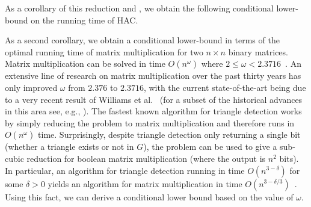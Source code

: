 As a corollary of this reduction and , we obtain the following conditional lower-bound on the running time of HAC.

\mainLowerSeq*

As a second corollary, we obtain a conditional lower-bound in terms of the optimal running time of matrix multiplication for two $n \times n$ binary matrices. 
Matrix multiplication can be solved in time $O(n^{\omega})$ where $2 \leq \omega < 2.3716$~\cite{williams2024new}. 
An extensive line of research on matrix multiplication over the past thirty years has only improved $\omega$ from $2.376$ to $2.3716$, with the current state-of-the-art being due to a very recent result of Williams et al.~\cite{williams2024new} (for a subset of the historical advances in this area see, e.g., \cite{coppersmith1982asymptotic, le2012faster, alman2021refined, williams2012multiplying}).
The fastest known algorithm for triangle detection works by simply reducing the problem to matrix multiplication and therefore runs in $O(n^{\omega})$ time.
Surprisingly, despite triangle detection only returning a single bit (whether a triangle exists or not in $G$), the problem can be used to give a sub-cubic reduction for boolean matrix multiplication (where the output is $n^2$ bits).
In particular, an algorithm for triangle detection running in time $O(n^{3-\delta})$ for some $\delta > 0$ yields an algorithm for matrix multiplication in time $O(n^{3-\delta/3})$~\cite{williams2010subcubic}.
Using this fact, we can derive a conditional lower bound based on the value of $\omega$.

\workmatmul*




